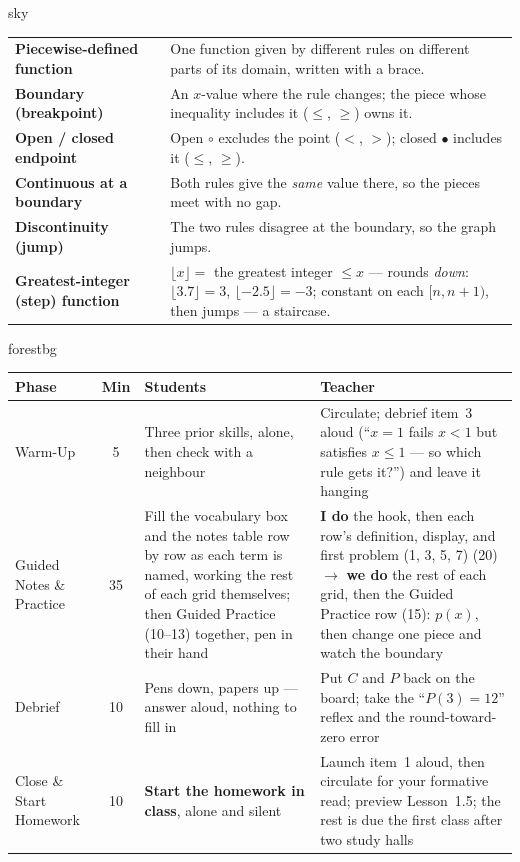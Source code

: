 \documentclass[10pt]{article}
\newcommand{\MeetingLength}{60 minutes}
\begin{document}
\boxguard
\begin{skillbox}{sky}
\renewcommand{\arraystretch}{1.3}
\begin{tabularx}{\linewidth}{@{}l X@{}}
\textbf{Piecewise-defined function} & One function given by different rules on different parts of its domain, written with a brace. \\
\textbf{Boundary (breakpoint)} & An $x$-value where the rule changes; the piece whose inequality includes it ($\le$, $\ge$) owns it. \\
\textbf{Open / closed endpoint} & Open $\circ$ excludes the point ($<$, $>$); closed $\bullet$ includes it ($\le$, $\ge$). \\
\textbf{Continuous at a boundary} & Both rules give the \emph{same} value there, so the pieces meet with no gap. \\
\textbf{Discontinuity (jump)} & The two rules disagree at the boundary, so the graph jumps. \\
\textbf{Greatest-integer (step) function} & $\lfloor x\rfloor=$ the greatest integer $\le x$ --- rounds \emph{down}: $\lfloor 3.7\rfloor=3$, $\lfloor-2.5\rfloor=-3$; constant on each $[n,n+1)$, then jumps --- a staircase. \\
\end{tabularx}
\end{skillbox}

\begin{fixedskillbox}[Lesson at a Glance --- \MeetingLength]{forestbg}
\renewcommand{\arraystretch}{1.25}
\begin{tabularx}{\linewidth}{@{}l c X X@{}}
\textbf{Phase} & \textbf{Min} & \textbf{Students} & \textbf{Teacher} \\
\hline
Warm-Up & 5 & Three prior skills, alone, then check with a neighbour & Circulate; debrief item~3
  aloud (``$x=1$ fails $x<1$ but satisfies $x\le1$ --- so which rule gets it?'') and leave it
  hanging \\
Guided Notes \& Practice & 35 & Fill the vocabulary box and the notes table row by row as each
  term is named, working the rest of each grid themselves; then Guided Practice (10--13) together,
  pen in their hand & \textbf{I do} the hook, then each row's definition, display, and first
  problem (1, 3, 5, 7) (20) $\to$ \textbf{we do} the rest of each grid, then the Guided Practice
  row (15): $p(x)$, then change one piece and watch the boundary \\
Debrief & 10 & Pens down, papers up --- answer aloud, nothing to fill in & Put $C$ and $P$ back
  on the board; take the ``$P(3)=12$'' reflex and the round-toward-zero error \\
Close \& Start Homework & 10 & \textbf{Start the homework in class}, alone and silent & Launch
  item~1 aloud, then circulate for your formative read; preview Lesson~1.5; the rest is due the
  first class after two study halls \\
\end{tabularx}
\end{fixedskillbox}
\end{document}

